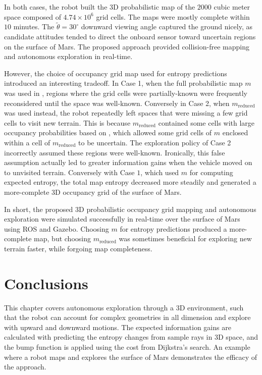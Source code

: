 In both cases, the robot built the 3D probabilistic map of the $2000$ cubic meter space composed of $4.74\times10^6$ grid cells. The maps were mostly complete within $10$ minutes. The $\tilde{\theta}=30^{\circ}$ downward viewing angle captured the ground nicely, as candidate attitudes tended to direct the onboard sensor toward uncertain regions on the surface of Mars. The proposed approach provided collision-free mapping and autonomous exploration in real-time.

However, the choice of occupancy grid map used for entropy predictions introduced an interesting tradeoff. In Case 1, when the full probabilistic map $m$ was used in , regions where the grid cells were partially-known were frequently reconsidered until the space was well-known. Conversely in Case 2, when $m_\text{reduced}$ was used instead, the robot repeatedly left spaces that were missing a few grid cells to visit new terrain. This is because $m_\text{reduced}$ contained some cells with large occupancy probabilities based on , which allowed some grid cells of $m$ enclosed within a cell of $m_\text{reduced}$ to be uncertain. The exploration policy of Case 2 incorrectly assumed these regions were well-known. Ironically, this false assumption actually led to greater information gains when the vehicle moved on to unvisited terrain. Conversely with Case $1$, which used $m$ for computing expected entropy, the total map entropy decreased more steadily and generated a more-complete 3D occupancy grid of the surface of Mars.

In short, the proposed 3D probabilistic occupancy grid mapping and autonomous exploration were simulated successfully in real-time over the surface of Mars using ROS and Gazebo. Choosing $m$ for entropy predictions produced a more-complete map, but choosing $m_\text{reduced}$ was sometimes beneficial for exploring new terrain faster, while forgoing map completeness.



\section{Conclusions}

This chapter covers autonomous exploration through a 3D environment, such that the robot can account for complex geometries in all dimension and explore with upward and downward motions. The expected information gains are calculated with predicting the entropy changes from sample rays in 3D space, and the bump function is applied using the cost from Dijkstra's search. An example where a robot maps and explores the surface of Mars demonstrates the efficacy of the approach.



